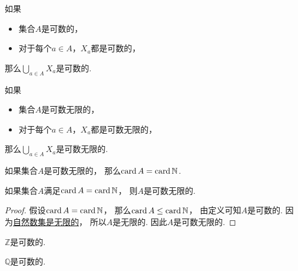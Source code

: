 \begin{proposition}
如果\begin{itemize}
	\item 集合\(A\)是可数的，
	\item 对于每个\(a \in A\)，\(X_a\)都是可数的，
\end{itemize}
那么\(\bigcup_{a \in A} X_a\)是可数的.
\end{proposition}

\begin{proposition}
如果\begin{itemize}
	\item 集合\(A\)是可数无限的，
	\item 对于每个\(a \in A\)，\(X_a\)都是可数无限的，
\end{itemize}
那么\(\bigcup_{a \in A} X_a\)是可数无限的.
\end{proposition}

\begin{proposition}
如果集合\(A\)是可数无限的，
那么\(\operatorname{card} A = \operatorname{card}{\mathbb{N}}\).
\end{proposition}

\begin{proposition}
如果集合\(A\)满足\(\operatorname{card} A = \operatorname{card}\mathbb{N}\)，
则\(A\)是可数无限的.
\begin{proof}
假设\(\operatorname{card} A = \operatorname{card}\mathbb{N}\)，
那么\(\operatorname{card} A \leq \operatorname{card}\mathbb{N}\)，
由定义可知\(A\)是可数的.
因为\hyperref[theorem:集合论.鸽巢原理.推论3]{自然数集是无限的}，
所以\(A\)是无限的.
因此\(A\)是可数无限的.
\end{proof}
\end{proposition}

\begin{corollary}
\(\mathbb{Z}\)是可数的.
\end{corollary}

\begin{corollary}
\(\mathbb{Q}\)是可数的.
\end{corollary}

